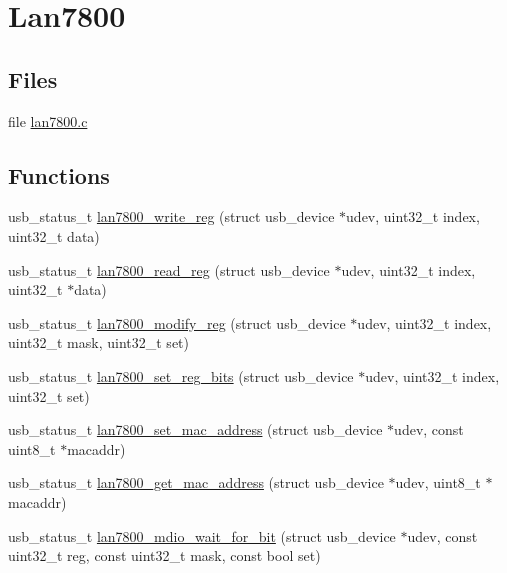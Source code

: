 \hypertarget{group__lan7800}{\section{Lan7800}
\label{group__lan7800}
}
\subsection*{Files}
\begin{DoxyCompactItemize}
\item 
file \hyperlink{lan7800_8c}{lan7800.\-c}
\end{DoxyCompactItemize}
\subsection*{Functions}
\begin{DoxyCompactItemize}
\item 
usb\-\_\-status\-\_\-t \hyperlink{group__lan7800_gac5a2ec33aa01163f97cfe029dab945d9}{lan7800\-\_\-write\-\_\-reg} (struct usb\-\_\-device $\ast$udev, uint32\-\_\-t index, uint32\-\_\-t data)
\item 
usb\-\_\-status\-\_\-t \hyperlink{group__lan7800_gaa07a9c41cdf666a27e67905ed9121e23}{lan7800\-\_\-read\-\_\-reg} (struct usb\-\_\-device $\ast$udev, uint32\-\_\-t index, uint32\-\_\-t $\ast$data)
\item 
usb\-\_\-status\-\_\-t \hyperlink{group__lan7800_ga2283a3790e3b0874e957b9c10ef44998}{lan7800\-\_\-modify\-\_\-reg} (struct usb\-\_\-device $\ast$udev, uint32\-\_\-t index, uint32\-\_\-t mask, uint32\-\_\-t set)
\item 
usb\-\_\-status\-\_\-t \hyperlink{group__lan7800_ga164a8202ae5fb3af0f6de37a166e83b9}{lan7800\-\_\-set\-\_\-reg\-\_\-bits} (struct usb\-\_\-device $\ast$udev, uint32\-\_\-t index, uint32\-\_\-t set)
\item 
usb\-\_\-status\-\_\-t \hyperlink{group__lan7800_ga6bfd9afefc7838b5a054d0bc3a03e1b4}{lan7800\-\_\-set\-\_\-mac\-\_\-address} (struct usb\-\_\-device $\ast$udev, const uint8\-\_\-t $\ast$macaddr)
\item 
usb\-\_\-status\-\_\-t \hyperlink{group__lan7800_ga835efd429fb96b942474c163a03f1b82}{lan7800\-\_\-get\-\_\-mac\-\_\-address} (struct usb\-\_\-device $\ast$udev, uint8\-\_\-t $\ast$macaddr)
\item 
usb\-\_\-status\-\_\-t \hyperlink{group__lan7800_gaf2e2dfd8f8f1403f261de53e0c4a072a}{lan7800\-\_\-mdio\-\_\-wait\-\_\-for\-\_\-bit} (struct usb\-\_\-device $\ast$udev, const uint32\-\_\-t reg, const uint32\-\_\-t mask, const bool set)

\end{DoxyCompactItemize}

